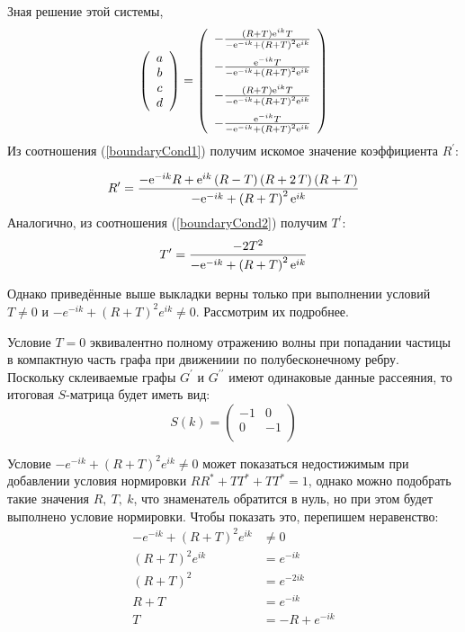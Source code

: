 \documentclass[a4 paper, 12 pt]{extarticle}
\begin{document}
   Зная решение этой системы,\[
   \left(\begin{array}{c}
   a \\
   b \\
   c \\
   d
   \end{array} \right) = 
   \left( \begin {array}{c} -{\frac { \left( R+T \right) {{\rm e}^{ik}}T
   	}{-{{\rm e}^{-ik}}+ \left(R+T\right)^2 {{\rm e}^{ik}
   }}}\\ \noalign{\medskip}-{\frac {{{\rm e}^{-ik}}T}{-{{\rm e}^{-ik}}+
   		\left(R+T\right)^2 {{\rm e}^{ik}}}}
   \\ \noalign{\medskip}-{\frac { \left( R+T \right) {{\rm e}^{ik}}T}{-{
   			{\rm e}^{-ik}}+ \left(R+T\right)^2 {{\rm e}^{ik}}}}
   \\ \noalign{\medskip}-{\frac {{{\rm e}^{-ik}}T}{-{{\rm e}^{-ik}}+
   		\left(R+T\right)^2 {{\rm e}^{ik}}}}\end {array}
   \right) 
   \]
   Из соотношения (\ref{boundaryCond1}) получим искомое значение коэффициента $R^\prime$:

   \[
   R^\prime = {\frac {-{{\rm e}^{-ik}}R+{{\rm e}^{ik}} \left( R-T \right)  \left( R+
   		2\,T \right)  \left( R+T \right) }{-{{\rm e}^{-ik}}+ \left( R+T\right)^2 {{\rm e}^{ik}}}}
   \]
   Аналогично, из соотношения (\ref{boundaryCond2}) получим $T^\prime$:
   \[
   T^\prime = {\frac {-2{T}^{2}}{-{{\rm e}^{-ik}}+ \left(R+T\right)^2 {{\rm e}^{ik}}}}
   \]
   
   Однако приведённые выше выкладки верны только при выполнении условий $T \neq 0$ и $-e^{-ik} + \left(R+T\right)^2 e^{ik} \neq 0$. Рассмотрим их подробнее.
   
   Условие $T = 0$ эквивалентно полному отражению волны при попадании частицы в компактную часть графа при движениии по полубесконечному ребру. Поскольку склеиваемые графы $G^\prime$ и $G^{\prime\prime}$ имеют одинаковые данные рассеяния, то итоговая $S$-матрица будет иметь вид:
   \[
   S(k)=\left(%
   \begin{array}{cc}
   -1 & 0 \\
   0 & -1 \\
   \end{array}%
   \right)
   \]
   
   Условие $-e^{-ik} + \left(R+T\right)^2 e^{ik} \neq 0$ может показаться недостижимым при добавлении условия нормировки $RR^* +TT^* +TT^* = 1$, однако можно подобрать такие значения $R, \ T, \ k$, что знаменатель обратится в нуль, но при этом будет выполнено условие нормировки. Чтобы показать это, перепишем неравенство:
   \[
   \begin{aligned}
   -e^{-ik} + \left(R+T\right)^2 e^{ik} &\neq 0 \\
   \left(R+T\right)^2 e^{ik} &= e^{-ik} \\
   \left(R+T\right)^2 &= e^{-2ik} \\
   R+T &= e^{-ik} \\
   T &= -R + e^{-ik}
   \end{aligned}
   \]
   
\end{document}
